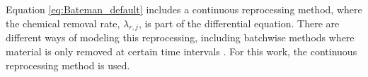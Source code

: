 Equation \eqref{eq:Bateman_default} includes a continuous reprocessing method, where the chemical removal rate, $\lambda_{r, j}$, is part of the differential equation.
There are different ways of modeling this reprocessing, including batchwise methods where material is only removed at certain time intervals \cite{seifert2023analysis}.
For this work, the continuous reprocessing method is used.





